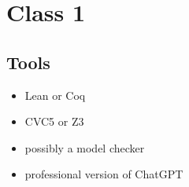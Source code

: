 {{%

\chapter{Class 1}

\newcommand{\Reals}{\mathbb{R}}

\section{Tools}
\begin{itemize}
  \item Lean or Coq 
  \item CVC5 or Z3 
  \item possibly a model checker 
  \item professional version of ChatGPT
\end{itemize}

}}
